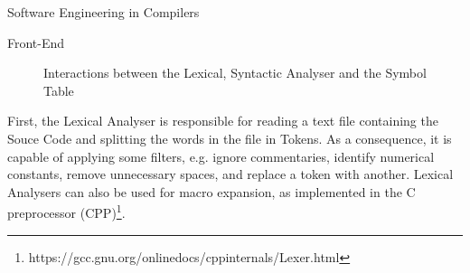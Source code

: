 \begin{section}{Software Engineering in Compilers}
\begin{subsection}{Front-End}
\begin{figure}
\begin{center}
{
}
\end{center}

\caption{Interactions between the Lexical, Syntactic Analyser and the Symbol Table}
\label{fig:lexico_sintatico}
\end{figure}


First, the Lexical Analyser is responsible for reading a text file containing
the Souce Code and splitting the words in the file in Tokens. As a consequence,
it is capable of applying some filters, e.g. ignore commentaries, identify
numerical constants, remove unnecessary spaces, and replace a token with
another.  Lexical Analysers can also be used for macro expansion, as
implemented in the C preprocessor
(CPP)\footnote{https://gcc.gnu.org/onlinedocs/cppinternals/Lexer.html}.



\end{subsection}
\end{section}
